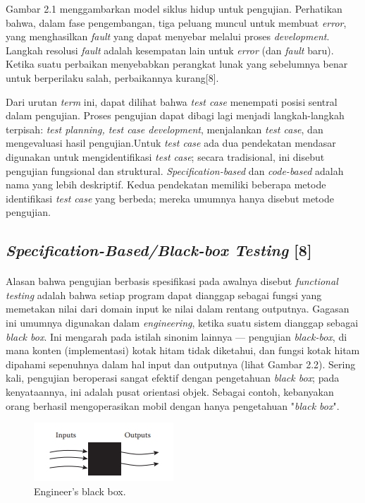 Gambar 2.1 menggambarkan model siklus hidup untuk pengujian. Perhatikan bahwa, dalam fase pengembangan, tiga peluang muncul untuk membuat \textit{error}, yang menghasilkan \textit{fault} yang dapat menyebar melalui proses \textit{development}. Langkah resolusi \textit{fault} adalah kesempatan lain untuk \textit{error} (dan \textit{fault} baru). Ketika suatu perbaikan menyebabkan perangkat lunak yang sebelumnya benar untuk berperilaku salah, perbaikannya kurang[8].

Dari urutan \textit{term} ini, dapat dilihat bahwa \textit{test case} menempati posisi sentral dalam pengujian. Proses pengujian dapat dibagi lagi menjadi langkah-langkah terpisah: \textit{test planning, test case development}, menjalankan \textit{test case}, dan mengevaluasi hasil pengujian.Untuk \textit{test case} ada dua pendekatan mendasar digunakan untuk mengidentifikasi \textit{test case}; secara tradisional, ini disebut pengujian fungsional dan struktural. \textit{Specification-based} dan \textit{code-based} adalah nama yang lebih deskriptif. Kedua pendekatan memiliki beberapa metode identifikasi \textit{test case} yang berbeda; mereka umumnya hanya disebut metode pengujian.

\subsection{\textit{Specification-Based/Black-box Testing} [8]}
\paragraph{} 
Alasan bahwa pengujian berbasis spesifikasi pada awalnya disebut \textit{functional testing} adalah bahwa setiap program dapat dianggap sebagai fungsi yang memetakan nilai dari domain input ke nilai dalam rentang outputnya. Gagasan ini umumnya digunakan dalam \textit{engineering}, ketika suatu sistem dianggap sebagai \textit{black box}. Ini mengarah pada istilah sinonim lainnya — pengujian \textit{black-box}, di mana konten (implementasi) kotak hitam tidak diketahui, dan fungsi kotak hitam dipahami sepenuhnya dalam hal input dan outputnya (lihat Gambar 2.2). Sering kali, pengujian beroperasi sangat efektif dengan pengetahuan \textit{black box}; pada kenyataannya, ini adalah pusat orientasi objek. Sebagai contoh, kebanyakan orang berhasil mengoperasikan mobil dengan hanya pengetahuan "\textit{black box}".
\begin{figure}[h!]
	\includegraphics[scale=1.0]{gambar/blackbox}
	\centering
	\caption{Engineer’s black box.}
\end{figure}

